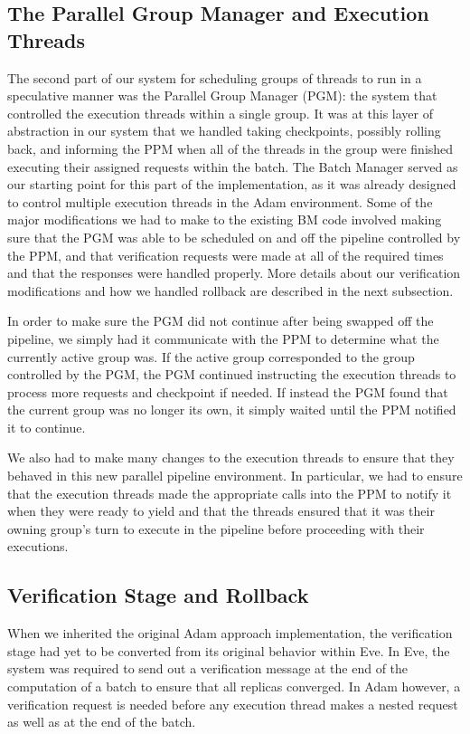 \documentclass[11pt, oneside]{report}
\begin{document}
\subsection{The Parallel Group Manager and Execution Threads}

The second part of our system for scheduling groups of threads to run in a speculative manner was the Parallel Group Manager (PGM): the system that controlled the execution threads within a single group. It was at this layer of abstraction in our system that we handled taking checkpoints, possibly rolling back, and informing the PPM when all of the threads in the group were finished executing their assigned requests within the batch. The Batch Manager served as our starting point for this part of the implementation, as it was already designed to control multiple execution threads in the Adam environment. Some of the major modifications we had to make to the existing BM code involved making sure that the PGM was able to be scheduled on and off the pipeline controlled by the PPM, and that verification requests were made at all of the required times and that the responses were handled properly. More details about our verification modifications and how we handled rollback are described in the next subsection. 

In order to make sure the PGM did not continue after being swapped off the pipeline, we simply had it communicate with the PPM to determine what the currently active group was. If the active group corresponded to the group controlled by the PGM, the PGM continued instructing the execution threads to process more requests and checkpoint if needed. If instead the PGM found that the current group was no longer its own, it simply waited until the PPM notified it to continue.

We also had to make many changes to the execution threads to ensure that they behaved in this new parallel pipeline environment. In particular, we had to ensure that the execution threads made the appropriate calls into the PPM to notify it when they were ready to yield and that the threads ensured that it was their owning group's turn to execute in the pipeline before proceeding with their executions.

\subsection{Verification Stage and Rollback}

When we inherited the original Adam approach implementation, the verification stage had yet to be converted from its original behavior within Eve. In Eve, the system was required to send out a verification message at the end of the computation of a batch to ensure that all replicas converged. In Adam however, a verification request is needed before any execution thread makes a nested request as well as at the end of the batch.
\end{document}
